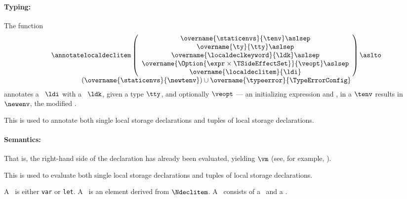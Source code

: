 \hypertarget{relation-annotatelocaldeclitem}{}
\paragraph{Typing:} The function
\[
  \begin{array}{c}
  \annotatelocaldeclitem
  \left(
    \begin{array}{c}
    \overname{\staticenvs}{\tenv} \aslsep\\
    \overname{\ty}{\tty} \aslsep\\
    \overname{\localdeclkeyword}{\ldk} \aslsep\\
    \overname{\Option{\expr\times\TSideEffectSet}}{\veopt} \aslsep\\
    \overname{\localdeclitem}{\ldi}
    \end{array}
   \right) \aslto\\
  (\overname{\staticenvs}{\newtenv})
  \cup \overname{\typeerror}{\TypeErrorConfig}
  \end{array}
\]
annotates a \localdeclarationitem\ $\ldi$ with a \localdeclarationkeyword\ $\ldk$, given a type $\tty$,
and optionally $\veopt$ --- an initializing expression and \sideeffectsetterm,
in a \staticenvironmentterm{} $\tenv$ results in $\newenv$, the modified
\staticenvironmentterm{}.
\ProseOtherwiseTypeError

This is used to annotate both single local storage declarations and tuples of local storage declarations.

\paragraph{Semantics:}
That is, the right-hand side of the declaration
has already been evaluated, yielding $\vm$ (see, for example, ).

This is used to evaluate both single local storage declarations and tuples of local storage declarations.

\hypertarget{def-localdeclarationkeyword}{}
\hypertarget{def-localdeclarationitem}{}
A \localdeclarationkeyword\ is either \texttt{var} or \texttt{let}.
A \localdeclarationitem\ is an element derived from $\Ndeclitem$.
\hypertarget{def-localdeclaration}{}
A \localdeclaration\ consists of a \localdeclarationitem\ and a \localdeclarationkeyword.

